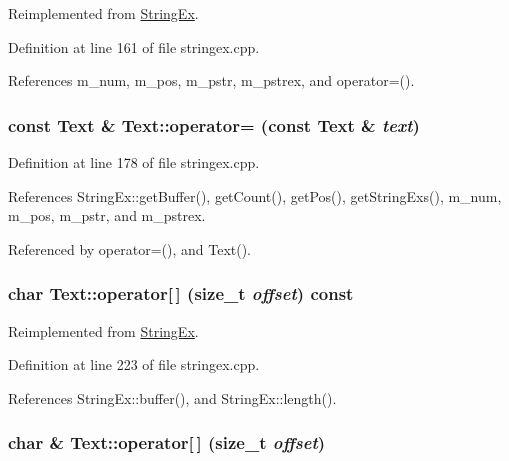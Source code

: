 Reimplemented from \hyperlink{classStringEx_1071b3e23def59810d2a7d97a134cd72}{StringEx}.

Definition at line 161 of file stringex.cpp.

References m\_\-num, m\_\-pos, m\_\-pstr, m\_\-pstrex, and operator=().\hypertarget{classText_ba22939eb006c390ae1cb05598a8cfc3}{
\subsubsection[{operator=}]{\setlength{\rightskip}{0pt plus 5cm}const {\bf Text} \& Text::operator= (const {\bf Text} \& {\em text})}}
\label{classText_ba22939eb006c390ae1cb05598a8cfc3}




Definition at line 178 of file stringex.cpp.

References StringEx::getBuffer(), getCount(), getPos(), getStringExs(), m\_\-num, m\_\-pos, m\_\-pstr, and m\_\-pstrex.

Referenced by operator=(), and Text().\hypertarget{classText_19b861315b5b50504740e3a843eba87b}{
\subsubsection[{operator[]}]{\setlength{\rightskip}{0pt plus 5cm}char Text::operator\mbox{[}$\,$\mbox{]} (size\_\-t {\em offset}) const}}
\label{classText_19b861315b5b50504740e3a843eba87b}




Reimplemented from \hyperlink{classStringEx_9d84497552f7c6adfd065bfb4f40f9c2}{StringEx}.

Definition at line 223 of file stringex.cpp.

References StringEx::buffer(), and StringEx::length().\hypertarget{classText_bccce5d5b11116ac065b910ce8eefe17}{
\subsubsection[{operator[]}]{\setlength{\rightskip}{0pt plus 5cm}char \& Text::operator\mbox{[}$\,$\mbox{]} (size\_\-t {\em offset})}}
\label{classText_bccce5d5b11116ac065b910ce8eefe17}




